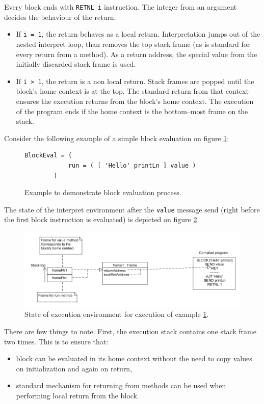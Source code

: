 \documentclass[thesis=M,english]{FITthesis}[2019/12/23]
\begin{document}
Every block ends with \texttt{RETNL i} instruction. The integer from an argument decides the behaviour of the return.
\begin{itemize}
	\item If \texttt{i = 1}, the return behaves as a local return. Interpretation jumps out of the nested interpret loop, than removes
		the top stack frame (as is standard for every return from a method). As a return address, the special value from the initially
		discarded stack frame is used.
	\item If \texttt{i > 1}, the return is a non local return. Stack frames are popped until the block's home context is at the top.
		The standard return from that context ensures the execution returns from the block's home context. The execution of the program
		ends if the home context is the bottom--most frame on the stack.
\end{itemize}

Consider the following example of a simple block evaluation on figure \ref{fig:block_eval_1}:
\begin{figure}[h!]
	\centering
	\begin{lstlisting}[language=Smalltalk]
		BlockEval = (
			run = ( [ 'Hello' printLn ] value )
		)
	\end{lstlisting}
	\caption{Example to demonstrate block evaluation process.}
	\label{fig:block_eval_1}
\end{figure}

The state of the interpret environment after the \texttt{value} message send (right before the first block instruction is evaluated) is depicted 
on figure \ref{fig:block_eval_1_diagram}.

\begin{figure}
	\centering
	\includegraphics[width=\textwidth]{media/block_exec_1.png}
	\caption{State of execution environment for execution of example \ref{fig:block_eval_1}.}
	\label{fig:block_eval_1_diagram}
\end{figure}

There are few things to note. First, the execution stack contains one stack frame two times. This is to ensure that:
\begin{itemize}
	\item block can be evaluated in its home context without the need to copy values on initialization and again on return,
	\item standard mechanism for returning from methods can be used when performing local return from the block.
\end{itemize}
\end{document}
